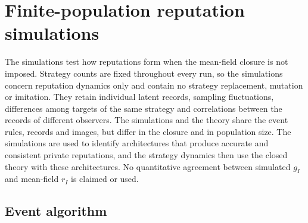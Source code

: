\documentclass[10pt]{wlscirep}
\theoremstyle{plain}
\theoremstyle{remark}
\begin{document}
\section{Finite-population reputation simulations}
\label{si:simulations}

The simulations test how reputations form when the mean-field closure is not imposed. Strategy counts are fixed throughout every run, so the simulations concern reputation dynamics only and contain no strategy replacement, mutation or imitation. They retain individual latent records, sampling fluctuations, differences among targets of the same strategy and correlations between the records of different observers. The simulations and the theory share the event rules, records and images, but differ in the closure and in population size. The simulations are used to identify architectures that produce accurate and consistent private reputations, and the strategy dynamics then use the closed theory with these architectures. No quantitative agreement between simulated $g_I$ and mean-field $r_I$ is claimed or used.

\subsection{Event algorithm}
\end{document}
